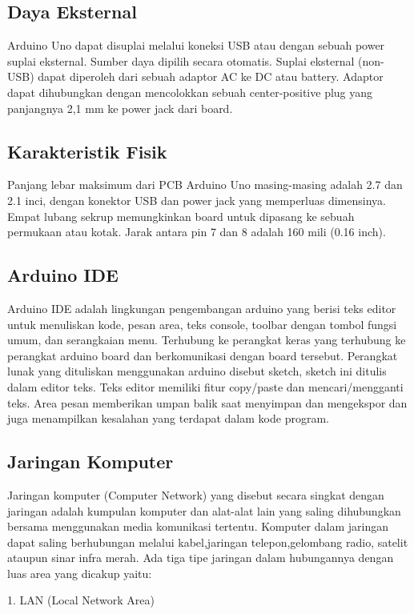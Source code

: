\documentclass{jtetiproposalskripsi}
\begin{document}
\subsection{Daya Eksternal}
Arduino Uno dapat disuplai melalui koneksi USB atau dengan sebuah power suplai eksternal. Sumber daya dipilih secara otomatis. Suplai eksternal (non-USB) dapat diperoleh dari sebuah adaptor AC ke DC atau battery. Adaptor dapat dihubungkan dengan mencolokkan sebuah center-positive plug yang panjangnya 2,1 mm ke power jack dari board.

\subsection{Karakteristik Fisik}
Panjang lebar maksimum dari PCB Arduino Uno masing-masing adalah 2.7 dan 2.1 inci, dengan konektor USB dan power jack yang memperluas dimensinya. Empat lubang sekrup memungkinkan board untuk dipasang ke sebuah permukaan atau kotak. Jarak antara pin 7 dan 8 adalah 160 mili (0.16 inch).



\subsection{Arduino IDE}
Arduino IDE adalah lingkungan pengembangan arduino yang berisi teks editor untuk menuliskan kode, pesan area, teks console, toolbar dengan tombol fungsi umum, dan serangkaian menu. Terhubung ke perangkat keras yang terhubung ke perangkat arduino board dan berkomunikasi dengan board tersebut. Perangkat lunak yang dituliskan menggunakan arduino disebut sketch, sketch ini ditulis dalam editor teks. Teks editor memiliki fitur copy/paste dan mencari/mengganti teks. Area pesan memberikan umpan balik saat menyimpan dan mengekspor dan juga menampilkan kesalahan yang terdapat dalam kode program.

\subsection{Jaringan Komputer}
Jaringan komputer (Computer Network) yang disebut secara singkat dengan jaringan adalah kumpulan komputer dan alat-alat lain yang saling dihubungkan bersama menggunakan media komunikasi tertentu.
Komputer dalam jaringan dapat saling berhubungan melalui kabel,jaringan telepon,gelombang radio, satelit ataupun sinar infra merah. Ada tiga tipe jaringan dalam hubungannya dengan luas area yang dicakup yaitu:
 
1. LAN (Local Network Area)
\end{document}

